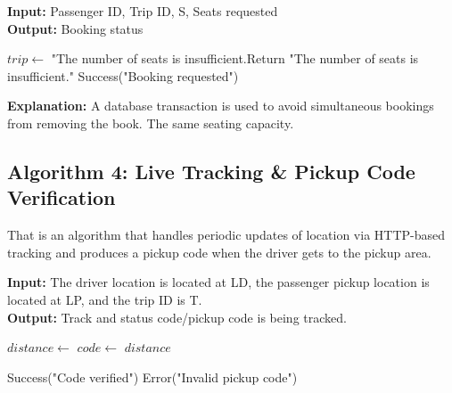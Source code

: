 \begin{breakablealgorithm}
\caption{Ride Booking and Seat Locking}
\textbf{Input:} Passenger ID, Trip ID, S, Seats requested \\
\textbf{Output:} Booking status
\begin{algorithmic}[1]
    \State {}
    \State $trip \gets$ 
        \State {}
        \State \Return "The number of seats is insufficient.Return "The number of seats is insufficient."
    \EndIf
    \State \Return Success("Booking requested")
\EndFunction
\end{algorithmic}
\end{breakablealgorithm}

\textbf{Explanation:} A database transaction is used to avoid simultaneous bookings from removing the book. The same seating capacity.

\subsection{Algorithm 4: Live Tracking \& Pickup Code Verification}

That is an algorithm that handles periodic updates of location via HTTP-based tracking and produces a pickup code when the driver gets to the pickup area.

\begin{breakablealgorithm}
\small
\caption{Live Tracking and Pickup Code Verification}
\textbf{Input:} The driver location is located at LD, the passenger pickup location is located at LP, and the trip ID is T. \\
\textbf{Output:} Track and status code/pickup code is being tracked.
\begin{algorithmic}[1]
    \State $distance \gets$ 
    \State {}
        \State $code \gets$ 
        \State {}
        \State {}
    \EndIf
    \State \Return $distance$
\EndFunction

        \State {}
        \State \Return Success("Code verified")
    \Else
        \State \Return Error("Invalid pickup code")
    \EndIf
\EndFunction
\end{algorithmic}
\end{breakablealgorithm}

